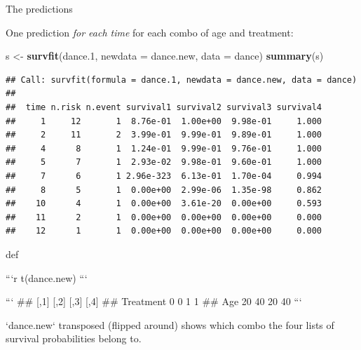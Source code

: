 \documentclass[ignorenonframetext,]{beamer}
\newenvironment{Shaded}{\begin{snugshade}}{\end{snugshade}}
\newcommand{\DataTypeTok}[1]{\textcolor[rgb]{0.13,0.29,0.53}{#1}}
\newcommand{\FloatTok}[1]{\textcolor[rgb]{0.00,0.00,0.81}{#1}}
\newcommand{\KeywordTok}[1]{\textcolor[rgb]{0.13,0.29,0.53}{\textbf{#1}}}
\newcommand{\NormalTok}[1]{#1}
\newcommand{\StringTok}[1]{\textcolor[rgb]{0.31,0.60,0.02}{#1}}
\begin{document}
\begin{frame}[fragile]{The predictions}
\protect\hypertarget{the-predictions-1}{}

One prediction \emph{for each time} for each combo of age and treatment:

\begin{Shaded}
\begin{Highlighting}[]
\NormalTok{s <-}\StringTok{ }\KeywordTok{survfit}\NormalTok{(dance}\FloatTok{.1}\NormalTok{, }\DataTypeTok{newdata =}\NormalTok{ dance.new, }\DataTypeTok{data =}\NormalTok{ dance)}
\KeywordTok{summary}\NormalTok{(s)}
\end{Highlighting}
\end{Shaded}

\begin{verbatim}
## Call: survfit(formula = dance.1, newdata = dance.new, data = dance)
## 
##  time n.risk n.event survival1 survival2 survival3 survival4
##     1     12       1  8.76e-01  1.00e+00  9.98e-01     1.000
##     2     11       2  3.99e-01  9.99e-01  9.89e-01     1.000
##     4      8       1  1.24e-01  9.99e-01  9.76e-01     1.000
##     5      7       1  2.93e-02  9.98e-01  9.60e-01     1.000
##     7      6       1 2.96e-323  6.13e-01  1.70e-04     0.994
##     8      5       1  0.00e+00  2.99e-06  1.35e-98     0.862
##    10      4       1  0.00e+00  3.61e-20  0.00e+00     0.593
##    11      2       1  0.00e+00  0.00e+00  0.00e+00     0.000
##    12      1       1  0.00e+00  0.00e+00  0.00e+00     0.000
\end{verbatim}

def

\begin{multicols}{2}

```r
t(dance.new)
```

```
##           [,1] [,2] [,3] [,4]
## Treatment    0    0    1    1
## Age         20   40   20   40
```

 
`dance.new` transposed (flipped around) shows which combo the
four lists of survival probabilities belong to.
\end{multicols}

\end{frame}
\end{document}
